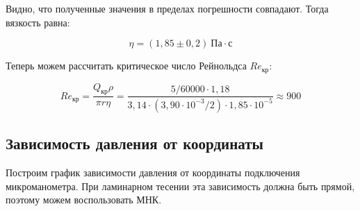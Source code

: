 \documentclass[a4paper,12pt]{article}
\begin{document}
Видно, что полученные значения в пределах погрешности совпадают. Тогда вязкость равна:

\begin{equation}
    \eta = (1,85 \pm 0,2) \ \text{Па} \cdot \text{с}
\end{equation}

Теперь можем рассчитать критическое число Рейнольдса $Re_\text{кр}$:

\begin{equation*}
    Re_\text{кр} = \frac{Q_\text{кр} \rho}{\pi r \eta} = \frac{5 / 60000 \cdot 1,18}{3,14 \cdot (3,90 \cdot 10^{-3} / 2) \cdot 1,85 \cdot 10^{-5}} \approx 900
\end{equation*}

\subsection{Зависимость давления от координаты}

Построим график зависимости давления от координаты подключения микроманометра. При ламинарном тесении эта зависимость должна быть прямой, поэтому можем воспользовать МНК.
\end{document}
